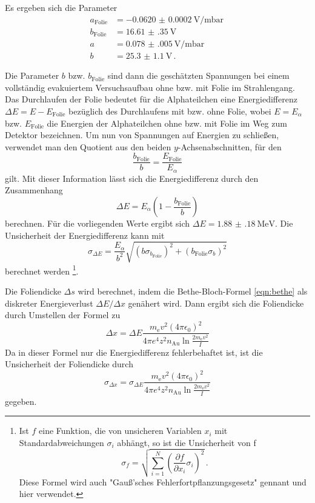 Es ergeben sich die Parameter
\begin{align*}
  a_{\text{Folie}}&=\SI{-0.0620(002)}{\volt\per\milli\bar} \, \\
  b_{\text{Folie}}&=\SI{16.61(35)}{\volt} \,\\
  a&=\SI{0.078(005)}{\volt\per\milli\bar} \, \\
  b&=\SI{25.3(11)}{\volt} \,.
\end{align*}

Die Parameter $b$ bzw. $b_{\text{Folie}}$ sind dann die geschätzten Spannungen bei einem vollständig evakuiertem Versuchsaufbau ohne bzw. mit Folie im Strahlengang.
Das Durchlaufen der Folie bedeutet für die Alphateilchen eine Energiedifferenz $\Delta E = E-E_{\text{Folie}}$ bezüglich des Durchlaufens mit bzw. ohne Folie, wobei $E = E_\alpha$ bzw. $E_{\text{Folie}}$ die Energien der Alphateilchen ohne bzw. mit Folie im Weg zum Detektor bezeichnen.
Um nun von Spannungen auf Energien zu schließen, verwendet man den Quotient aus den beiden $y$-Achsenabschnitten, für den
\begin{equation*}
  \frac{b_{\text{Folie}}}{b} = \frac{E_{\text{Folie}}}{E_\alpha}
\end{equation*}
gilt. Mit dieser Information lässt sich die Energiedifferenz durch den Zusammenhang
\begin{equation*}
  \Delta E = E_\alpha \left( 1 - \frac{b_{\text{Folie}}}{b} \right)
\end{equation*}
berechnen. Für die vorliegenden Werte ergibt sich $\Delta E = \SI{1.88(18)}{\mega\electronvolt}$.
Die Unsicherheit der Energiedifferenz kann mit
\begin{equation*}
  \sigma_{\Delta E} = \frac{E_\alpha}{b^2} \sqrt{\left( b \sigma_{b_\text{Folie}} \right)^2 + \left( b_\text{Folie} \sigma_b \right)^2}
\end{equation*}
berechnet werden \footnote{Ist $f$ eine Funktion, die von unsicheren Variablen $x_i$ mit
Standardabweichungen $\sigma_i$ abhängt, so ist die Unsicherheit von f
\begin{equation}
  \sigma_f = \sqrt{
    \sum\limits_{i = 1}^N
      \left( \frac{\partial f}{\partial x_i} \sigma_i \right)^{\!\! 2}
  }\,.
  \label{eqn:gaussfehler}
\end{equation}
Diese Formel wird auch "Gauß'sches Fehlerfortpflanzungsgesetz" gennant und hier verwendet.}.

Die Foliendicke $\Delta s$ wird berechnet, indem die Bethe-Bloch-Formel \eqref{eqn:bethe} als diskreter Energieverlust $\Delta E/\Delta x$ genähert wird.
Dann ergibt sich die Foliendicke durch Umstellen der Formel zu
\begin{equation}
  \Delta x = \Delta E
  \frac{m_{\mathrm{e}} v^2(4 \pi \epsilon_{\mathrm{0}})^2}
  {4\pi e^4 z^2 n_\text{Au} \ln{\frac{2 m_{\mathrm{e}} v^2}{I}}}
  \label{eqn:foliendicke}
\end{equation}
Da in dieser Formel nur die Energiedifferenz fehlerbehaftet ist, ist die Unsicherheit der Foliendicke durch
\begin{equation*}
  \sigma_{\Delta x} = \sigma_{\Delta E}
  \frac{m_{\mathrm{e}} v^2(4 \pi \epsilon_{\mathrm{0}})^2}
  {4\pi e^4 z^2 n_\text{Au} \ln{\frac{2 m_{\mathrm{e}} v^2}{I}}}
\end{equation*}
gegeben.

